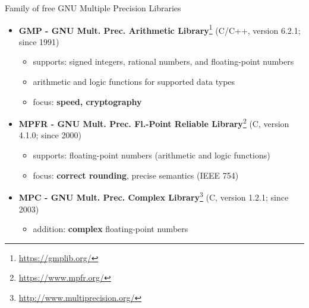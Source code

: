 \begin{frame}{Family of free GNU Multiple Precision Libraries}

\begin{itemize}\itemsep0.5em

\item
\textbf{GMP - GNU Mult. Prec. Arithmetic Library}\footnote{\tiny
\url{https://gmplib.org/}}
(C/C++, version 6.2.1; since 1991)
\begin{itemize}
\item
supports: signed integers, rational numbers, and floating-point numbers

\item
arithmetic and logic functions for supported data types

\item
focus: \textbf{speed, cryptography}
\end{itemize}

\item
\textbf{MPFR - GNU Mult. Prec. Fl.-Point Reliable Library}\footnote{\tiny
\url{https://www.mpfr.org/}}
(C, version 4.1.0; since 2000)
\begin{itemize}
\item
supports: floating-point numbers (arithmetic and logic functions)

\item
focus: \textbf{correct rounding}, precise semantics (IEEE 754)
\end{itemize}

\item
\textbf{MPC - GNU Mult. Prec. Complex Library}\footnote{\tiny
\url{http://www.multiprecision.org/}}
(C, version 1.2.1; since 2003)
\begin{itemize}
\item
addition: \textbf{complex} floating-point numbers
\end{itemize}



\end{itemize}

\end{frame}



